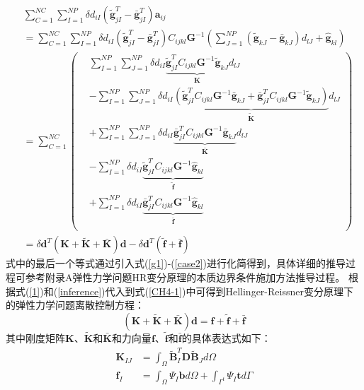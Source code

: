 \begin{equation}\label{inference}
\begin{split}
    &\sum_{C=1}^{N\!C}\sum_{I=1}^{N\!P}\delta d_{iI}(\tilde{\pmb g}_{jI}^T-\bar{\pmb g}_{jI}^T)\pmb{a}_{ij}\\
    &=\sum_{C=1}^{N\!C}\sum_{I=1}^{N\!P}\delta d_{iI}(\tilde{\pmb g}_{jI}^T-\bar{\pmb g}_{jI}^T)C_{ijkl}\pmb{G}^{-1}(\sum_{J=1}^{N\!P}(\tilde{\pmb g}_{kJ}-\bar{\pmb g}_{kJ})d_{lJ}+\hat{\pmb g}_{kl})\\
    &=\sum_{C=1}^{N\!C}
    \left(\begin{split}
    &\sum_{I=1}^{N\!P}\sum_{J=1}^{N\!P}\delta d_{iI}\underbrace{\tilde{\pmb g}^T_{jI}C_{ijkl}\pmb{G}^{-1}\tilde{\pmb g}_{kJ}}_{\pmb{K}}d_{lJ}\\
    &-\sum_{I=1}^{N\!P}\sum_{J=1}^{N\!P}\delta d_{iI}\underbrace{(\tilde{\pmb g}^T_{jI}C_{ijkl}\pmb{G}^{-1}\bar{\pmb g}_{kJ}
    +\bar{\pmb g}^T_{jI}C_{ijkl}\pmb{G}^{-1}\tilde{\pmb g}_{kJ})}_{\tilde{\pmb K}}d_{lJ}\\
    &+\sum_{I=1}^{N\!P}\sum_{J=1}^{N\!P}\delta d_{iI}\underbrace{\bar{\pmb g}^T_{jI}C_{ijkl}\pmb{G}^{-1}\bar{\pmb g}_{kJ}}_{\bar{\pmb K}}d_{lJ}\\
    &-\sum_{I=1}^{N\!P}\delta d_{iI}\underbrace{\tilde{\pmb g}_{jI}^TC_{ijkl}\pmb{G}^{-1}\hat{\pmb g}_{kl}}_{\tilde{\pmb f}}\\
    &+\sum_{I=1}^{N\!P}\delta d_{iI}\underbrace{\bar{\pmb g}_{jI}^TC_{ijkl}\pmb{G}^{-1}\hat{\pmb g}_{kl}}_{\bar{\pmb f}}\\
    \end{split}
    \right)\\
    &=\delta\pmb{d}^T(\pmb K+\tilde{\pmb K}+\bar{\pmb K})\pmb{d}-\delta\pmb{d}^T(\tilde{\pmb f}+\bar{\pmb f})
\end{split}
\end{equation}
式中的最后一个等式通过引入式(\ref{g1})-(\ref{case2})进行化简得到，具体详细的推导过程可参考附录A弹性力学问题HR变分原理的本质边界条件施加方法推导过程。
根据式(\ref{1})和(\ref{inference})代入到式(\ref{CH4-1})中可得到Hellinger-Reissner变分原理下的弹性力学问题离散控制方程：
\begin{equation}\label{equationE}
    (\pmb{K}+\pmb{\tilde{K}}+\pmb{\bar{K}})\pmb{d}=\pmb{f}+\tilde{\pmb{f}}+\bar{\pmb{f}}
\end{equation}
其中刚度矩阵$\pmb K$、$\tilde{\pmb K}$和$\bar{\pmb K}$和力向量$\pmb f$、$\tilde{\pmb f}$和$\bar{\pmb f}$的具体表达式如下：
\begin{subequations}\label{Ehr1}
\begin{align}    
    \pmb{K}_{IJ}&=\int_{\Omega}\tilde{\pmb{B}}_I^T\pmb{D}\tilde{\pmb{B}}_Jd\Omega\\
    \pmb f_I&=\int_{\Omega}\Psi_I\pmb{b}d\Omega+\int_{\Gamma^t}\Psi_I\pmb{t}d\Gamma
\end{align}
\end{subequations}
